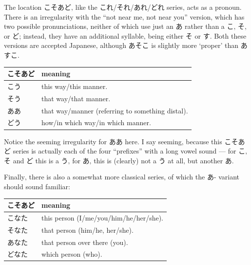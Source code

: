\documentclass[11pt, b5paper, twoside, openright, onecolumn]{book}
\newenvironment{mytabularcentered}[1]{\noindent
\begin{center}\begin{tabular}[h]{#1}}{\end{tabular}\end{center}}
\begin{document}
The location こそあど‚ like the これ/それ/あれ/どれ series‚ acts as a pronoun. There is an irregularity with the “not near me‚ not near you” version‚ which has two possible pronunciations‚ neither of which use just an あ rather than a こ‚ そ‚ or ど; instead‚ they have an additional syllable‚ being either そ or す. Both these versions are accepted Japanese‚ although あそこ is slightly more ‘proper’ than あすこ.

\vspace{0.5cm}
\smaller
\begin{center}
\begin{mytabularcentered}{| l  l |}\hline 
\rule{0pt}{2.4ex}こそあど & meaning\\ 
\hline
\rule{0pt}{2.4ex}\index[japanese]{こう}こう & \index[english]{This!way}this way/\index[english]{This!manner}this manner.\\ 
\rule{0pt}{2.4ex}\index[japanese]{そう}そう & \index[english]{That!way}that way/\index[english]{That!manner}that manner.\\ 
\rule{0pt}{2.4ex}\index[japanese]{ああ}ああ & that way/manner (referring to something distal).\\ 
\rule{0pt}{2.4ex}\index[japanese]{どう}どう & \index[english]{How}how/\index[english]{Which!way}in which way/\index[english]{Which!manner}in which manner.\\ 
\hline 
\end{mytabularcentered}
\end{center}
\larger
\vspace{0.5cm}


Notice the seeming irregularity for ああ here. I say seeming‚ because this こそあど series is actually each of the four “prefixes” with a long vowel sound — for こ‚ そ and ど this is a う‚ for あ‚ this is (clearly) not a う at all‚ but another あ.

Finally‚ there is also a somewhat more classical series‚ of which the あ- variant should sound familiar:

\vspace{0.5cm}
\smaller
\begin{center}
\begin{mytabularcentered}{| l  l |}\hline 
\rule{0pt}{2.4ex}こそあど & meaning\\ 
\hline
\rule{0pt}{2.4ex}\index[japanese]{こなた}こなた & \index[english]{This!person}this person (I/me/you/him/he/her/she).\\ 
\rule{0pt}{2.4ex}\index[japanese]{そなた}そなた & \index[english]{That!person}that person (him/he‚ her/she).\\ 
\rule{0pt}{2.4ex}\index[japanese]{あなた}あなた & that person over there (you).\\ 
\rule{0pt}{2.4ex}\index[japanese]{どなた}どなた & \index[english]{Which!person}which person (\index[english]{Who}who).\\ 
\hline 
\end{mytabularcentered}
\end{center}
\larger
\vspace{0.5cm}
\end{document}
